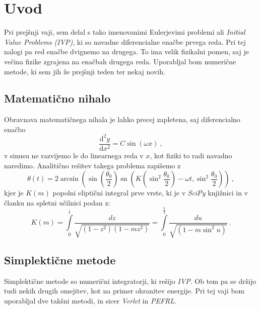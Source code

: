 \documentclass{porocilo}
\newcommand{\ddd}{\mathrm{d}}
\newcommand{\Dd}[3][{}]{\frac{\ddd^{#1} #2}{\ddd#3^{#1}}}
\begin{document}
\maketitle

\section{Uvod}
Pri prejšnji vaji, sem delal s tako imenovanimi Eulerjevimi problemi ali \textit{Initial Value Problems (IVP)}, ki so navadne diferencialne enačbe prvega reda. Pri tej nalogi pa red enačbe dvignemo na drugega. To ima velik fizikalni pomen, saj je večina fizike zgrajena na enačbah drugega reda. Uporabljal bom numerične metode, ki sem jih že prejšnji teden ter nekaj novih.

\subsection{Matematično nihalo}
Obravnava matematičnega nihala je lahko precej zapletena, saj diferencialno enačbo
\begin{equation}
    \Dd[2]{y}{x} = C \sin(\omega x) \>,
\end{equation}
v sinusu ne razvijemo le do linearnega reda v $x$, kot fiziki to radi navadno naredimo. Analitično rešitev takega problema zapišemo z
\begin{equation*}
    \theta(t) = 2 \arcsin \left(\sin \left(\frac{\theta_0}{2}\right) \operatorname{sn} \left(K\left(\sin^2 \frac{\theta_0}{2}\right) - \omega t, \sin^2 \frac{\theta_0}{2}\right)\right) \>,
\end{equation*}
kjer je $K(m)$ popolni eliptični integral prve vrste, ki je v \textit{SciPy} knjižnici in v članku na spletni učilnici podan z:
\begin{equation*}
    K(m)=\int\limits_{0}^{1} \frac{d z}{\sqrt{\left(1-z^{2}\right)\left(1-m z^{2}\right)}} = \int\limits_{0}^{\frac{\pi}{2}} \frac{d u}{\sqrt{\left(1-m \sin^2{u}\right)}} \>.
\end{equation*}

\subsection{Simplektične metode}
Simplektične metode so numerični integratorji, ki rešijo \textit{IVP}. Ob tem pa se držijo tudi nekih drugih omejitev, kot na primer ohranitev energije. Pri tej vaji bom uporabljal dve takšni metodi, in sicer \textit{Verlet} in \textit{PEFRL}.
\end{document}
